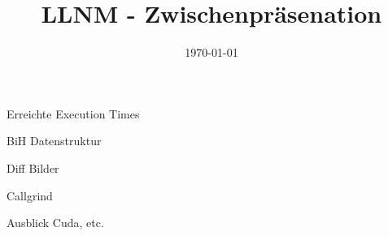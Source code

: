 

\title[LLNM]{LLNM - Zwischenpräsenation}
\subtitle{}
\date{\today}

	\begin{frame}
		\titlepage
	\end{frame}
	\begin{frame}{Erreichte Execution Times}

	\end{frame}
	\begin{frame}{BiH Datenstruktur}

	\end{frame}
	\begin{frame}{Diff Bilder}

	\end{frame}
	\begin{frame}{Callgrind}

	\end{frame}
	\begin{frame}{Ausblick}
		Cuda, etc.
	\end{frame}


